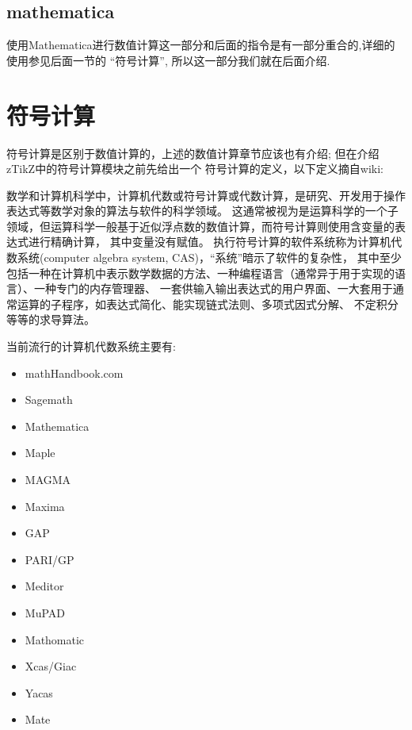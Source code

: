 \subsection{mathematica}
使用Mathematica进行数值计算这一部分和后面的\cmd{\wolfram}\index{\cmd{\wolfram}}指令是有一部分重合的,详细的使用参见后面一节的
``符号计算'', 所以这一部分我们就在后面介绍.


\section{符号计算}
符号计算是区别于数值计算的，上述的数值计算章节应该也有介绍; 但在介绍zTikZ中的符号计算模块之前先给出一个
符号计算的定义，以下定义摘自wiki:

\begin{leftbar}
\kaishu 数学和计算机科学中，计算机代数或符号计算或代数计算，是研究、开发用于操作表达式等数学对象的算法与软件的科学领域。
这通常被视为是运算科学的一个子领域，但运算科学一般基于近似浮点数的数值计算，而符号计算则使用含变量的表达式进行精确计算，
其中变量没有赋值。 执行符号计算的软件系统称为计算机代数系统(computer algebra system, CAS)，``系统''暗示了软件的复杂性，
其中至少包括一种在计算机中表示数学数据的方法、一种编程语言（通常异于用于实现的语言）、一种专门的内存管理器、
一套供输入输出表达式的用户界面、一大套用于通常运算的子程序，如表达式简化、能实现链式法则、多项式因式分解、
不定积分等等的求导算法。
\end{leftbar}

当前流行的计算机代数系统主要有:
\begin{multicols}{2}
    \begin{itemize}
    \item mathHandbook.com
    \item Sagemath
    \item Mathematica
    \item Maple
    \item MAGMA
    \item Maxima
    \item GAP
    \item PARI/GP
    \item Meditor
    \item MuPAD
    \item Mathomatic
    \item Xcas/Giac
    \item Yacas
    \item Mate
    \end{itemize}
\end{multicols}

